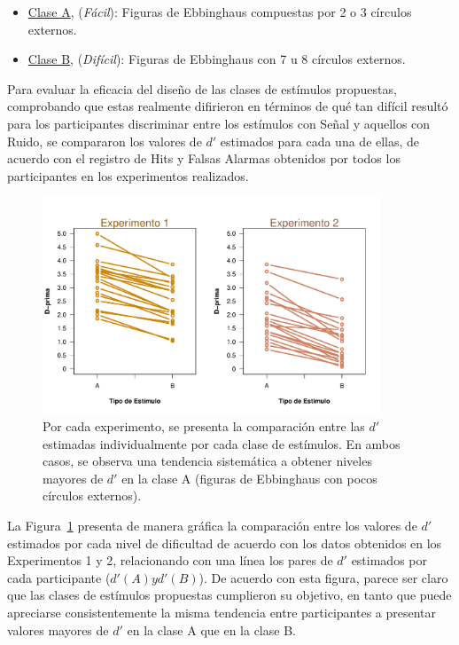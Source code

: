 \begin{itemize}
\item \underline{Clase A}, (\textit{Fácil}): Figuras de Ebbinghaus compuestas por 2 o 3 círculos externos.\\

\item \underline{Clase B}, (\textit{Difícil}): Figuras de Ebbinghaus con 7 u 8 círculos externos.\\
\end{itemize}

Para evaluar la eficacia del diseño de las clases de estímulos propuestas, comprobando que estas realmente difirieron en términos de qué tan difícil resultó para los participantes discriminar entre los estímulos con Señal y aquellos con Ruido, se compararon los valores de $d'$ estimados para cada una de ellas, de acuerdo con el registro de Hits y Falsas Alarmas obtenidos por todos los participantes en los experimentos realizados.\\

\begin{figure}[th]
\centering
\includegraphics[width=0.90\textwidth]{Figures/Diff_D_E1yE2}
\caption[Resultados: Comparación de las $d'$ computadas por cada clase de estímulos]{Por cada experimento, se presenta la comparación entre  las $d'$ estimadas individualmente por cada clase de estímulos. En ambos casos, se observa una tendencia sistemática a obtener niveles mayores de $d'$ en la clase A (figuras de Ebbinghaus con pocos círculos externos).}
\label{fig:Diff_D}
\end{figure}

La Figura~\ref{fig:Diff_D} presenta de manera gráfica la comparación entre los valores de $d'$ estimados por cada nivel de dificultad de acuerdo con los datos obtenidos en los Experimentos 1 y 2, relacionando con una línea los pares de $d'$ estimados por cada participante ($d'(A) y d'(B)$). De acuerdo con esta figura, parece ser claro que las clases de estímulos propuestas cumplieron su objetivo, en tanto que puede apreciarse consistentemente la misma tendencia entre participantes a presentar valores mayores de $d'$ en la clase A que en la clase B.\\

